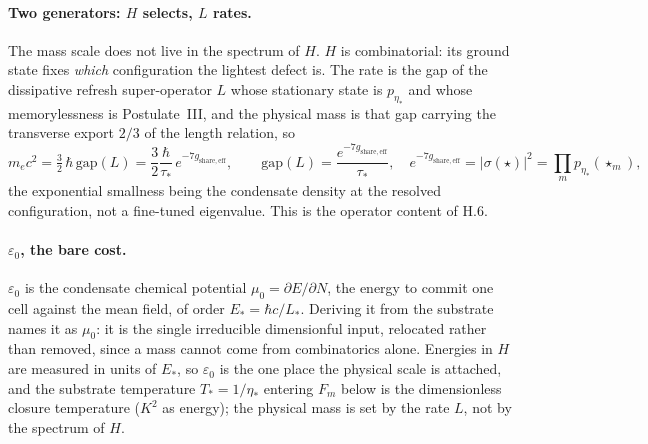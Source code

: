 \documentclass[11pt]{article}
\begin{document}
\paragraph{Two generators: $H$ selects, $L$ rates.}
The mass scale does not live in the spectrum of $H$. $H$ is combinatorial: its ground state fixes \emph{which} configuration the lightest defect is. The rate is the gap of the dissipative refresh super-operator $L$ whose stationary state is $p_{\eta_*}$ and whose memorylessness is Postulate~III, and the physical mass is that gap carrying the transverse export $2/3$ of the length relation, so
\[
m_e c^2=\tfrac32\,\hbar\,\mathrm{gap}(L)=\frac{3}{2}\frac{\hbar}{\tau_*}\,e^{-7g_{\mathrm{share,eff}}},\qquad \mathrm{gap}(L)=\frac{e^{-7g_{\mathrm{share,eff}}}}{\tau_*},\quad e^{-7g_{\mathrm{share,eff}}}=|\sigma(\star)|^2=\prod_m p_{\eta_*}(\star_m),
\]
the exponential smallness being the condensate density at the resolved configuration, not a fine-tuned eigenvalue. This is the operator content of H.6.

\paragraph{$\varepsilon_0$, the bare cost.}
$\varepsilon_0$ is the condensate chemical potential $\mu_0=\partial E/\partial N$, the energy to commit one cell against the mean field, of order $E_*=\hbar c/L_*$. Deriving it from the substrate names it as $\mu_0$: it is the single irreducible dimensionful input, relocated rather than removed, since a mass cannot come from combinatorics alone. Energies in $H$ are measured in units of $E_*$, so $\varepsilon_0$ is the one place the physical scale is attached, and the substrate temperature $T_*=1/\eta_*$ entering $F_m$ below is the dimensionless closure temperature ($K^2$ as energy); the physical mass is set by the rate $L$, not by the spectrum of $H$.
\end{document}
